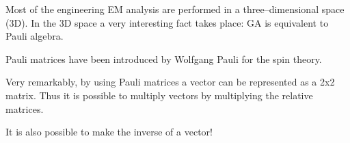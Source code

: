 \documentclass[handout,10pt]{beamer}
\begin{document}
\begin{frame}[fragile]{}

Most of the engineering EM analysis are performed in a three--dimensional space (3D). 
In the 3D space a very interesting fact takes place: \alert{GA is equivalent to Pauli algebra}.

Pauli matrices have been introduced by Wolfgang Pauli 
for the spin theory.

Very remarkably, \alert{by using Pauli matrices a vector can be represented as a 2x2 matrix}. 
Thus it is possible to multiply vectors by multiplying the relative matrices. 

\alert{It is also possible to make the inverse of a vector!}
\end{frame}

\end{document}
